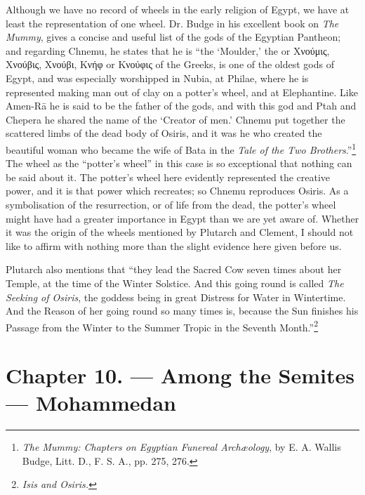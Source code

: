\documentclass[a4paper, 11pt, oneside, polutonikogreek, english]{article}
\begin{document}
Although we have no record of wheels in the early religion of Egypt, we have at least the representation of one wheel. Dr. Budge in his excellent book on \emph{The Mummy}, gives a concise and useful list of the gods of the Egyptian Pantheon; and regarding Chnemu, he states that he is ``the `Moulder,' the or Χνούμις, Χνούβις, Χνούβι, Κνήφ or Κνούφις of the Greeks, is one of the oldest gods of Egypt, and was especially worshipped in Nubia, at Philae, where he is represented making man out of clay on a potter's wheel, and at Elephantine. Like Amen-Rā he is said to be the father of the gods, and with this god and Ptah and Chepera he shared the name of the `Creator of men.' Chnemu put together the scattered limbs of the dead body of Osiris, and it was he who created the beautiful woman who became the wife of Bata in the \emph{Tale of the Two Brothers}.''\footnote{\emph{The Mummy: Chapters on Egyptian Funereal Archæology}, by E. A. Wallis Budge, Litt. D., F. S. A., pp. 275, 276.} The wheel as the ``potter's wheel'' in this case is so exceptional that nothing can be said about it. The potter's wheel here evidently represented the creative power, and it is that power which recreates; so Chnemu reproduces Osiris. As a symbolisation of the resurrection, or of life from the dead, the potter's wheel might have had a greater importance in Egypt than we are yet aware of. Whether it was the origin of the wheels mentioned by Plutarch and Clement, I should not like to affirm with nothing more than the slight evidence here given before us.

Plutarch also mentions that ``they lead the Sacred Cow seven times about her Temple, at the time of the Winter Solstice. And this going round is called \emph{The Seeking of Osiris}, the goddess being in great Distress for Water in Wintertime. And the Reason of her going round so many times is, because the Sun finishes his Passage from the Winter to the Summer Tropic in the Seventh Month.''\footnote{\emph{Isis and Osiris.}}
\clearpage
\section{Chapter 10. --- Among the Semites --- Mohammedan}
\end{document}
